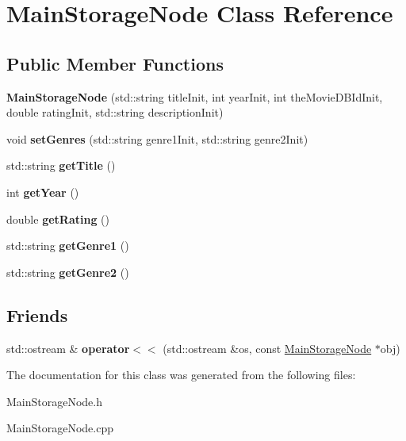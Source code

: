 \hypertarget{class_main_storage_node}{}\section{Main\+Storage\+Node Class Reference}
\label{class_main_storage_node}
\subsection*{Public Member Functions}
\begin{DoxyCompactItemize}
\item 
\mbox{\label{class_main_storage_node_a9c32f059068fa4b1aafc79b41987aff8}} 
{\bfseries Main\+Storage\+Node} (std\+::string title\+Init, int year\+Init, int the\+Movie\+D\+B\+Id\+Init, double rating\+Init, std\+::string description\+Init)
\item 
\mbox{\label{class_main_storage_node_a8ebbfebff3da8b3d124c2e343d73fb61}} 
void {\bfseries set\+Genres} (std\+::string genre1\+Init, std\+::string genre2\+Init)
\item 
\mbox{\label{class_main_storage_node_aa088226c953fce886abb5bbd67ede0be}} 
std\+::string {\bfseries get\+Title} ()
\item 
\mbox{\label{class_main_storage_node_a82abc37501d50c8dd97cef8d4ea7a757}} 
int {\bfseries get\+Year} ()
\item 
\mbox{\label{class_main_storage_node_a1afeaa9e324a1c30bcc5b557ae1522ea}} 
double {\bfseries get\+Rating} ()
\item 
\mbox{\label{class_main_storage_node_a06dccc8950e10fcdc74704cbcc2db5ed}} 
std\+::string {\bfseries get\+Genre1} ()
\item 
\mbox{\label{class_main_storage_node_a462a8ce932acaf3c08dffbbdd4e91338}} 
std\+::string {\bfseries get\+Genre2} ()
\end{DoxyCompactItemize}
\subsection*{Friends}
\begin{DoxyCompactItemize}
\item 
\mbox{\label{class_main_storage_node_ab4c8d839103818503935eeb693572f86}} 
std\+::ostream \& {\bfseries operator$<$$<$} (std\+::ostream \&os, const \hyperlink{class_main_storage_node}{Main\+Storage\+Node} $\ast$obj)
\end{DoxyCompactItemize}


The documentation for this class was generated from the following files\+:\begin{DoxyCompactItemize}
\item 
Main\+Storage\+Node.\+h\item 
Main\+Storage\+Node.\+cpp\end{DoxyCompactItemize}
